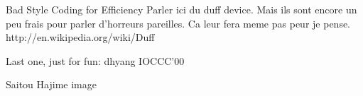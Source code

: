 \begin{frameTODO}{Bad Style Coding for Efficiency}
  Parler ici du duff device. Mais ils sont encore un peu frais pour parler
  d'horreurs pareilles. Ca leur fera meme pas peur je pense.
http://en.wikipedia.org/wiki/Duff%
\end{frameTODO}
\begin{frame}[t]{Last one, just for fun: dhyang IOCCC'00}

  \vspace{-.5\baselineskip} Saitou Hajime image \visible<2->{that prints a
    prog}  

  \medskip


\end{frame}

